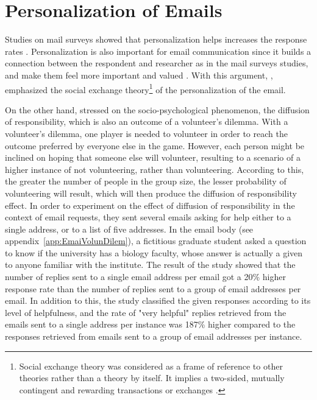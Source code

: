 \section{Personalization of Emails}
\label{sec:2.3:PersEmai}
Studies on mail surveys showed that personalization helps increases the response rates \citep{Dillman1991,Schaefer1998}. Personalization is also important for email communication since it builds a connection between the respondent and researcher as in the mail surveys studies, and make them feel more important and valued \citep[page 272]{DillmanDonA.SmythJoleneD.Christian2009}. With this argument, \cite{DillmanDonA.SmythJoleneD.Christian2009}, emphasized the social exchange theory\footnote{Social exchange theory was considered as a frame of reference to other theories rather than a theory by itself. It implies a two-sided, mutually contingent and rewarding transactions or exchanges \citep{Emerson1976}.} of the personalization of the email.
\vspace{1cm}

On the other hand, \cite{Barron2002} stressed on the socio-psychological phenomenon, the diffusion of responsibility, which is also an outcome of a volunteer's dilemma. With a volunteer's dilemma, one player is needed to volunteer in order to reach the outcome preferred by everyone else in the game. However, each person might be inclined on hoping that someone else will volunteer, resulting to a scenario of a higher instance of not volunteering, rather than volunteering. According to this, the greater the number of people in the group size, the lesser probability of volunteering will result, which will then produce the diffusion of responsibility effect. In order to experiment on the effect of diffusion of responsibility in the context of email requests, they sent several emails asking for help either to a single address, or to a list of five addresses. In the email body (see appendix~\ref{app:EmaiVolunDilem}), a fictitious graduate student asked a question to know if the university has a biology faculty, whose answer is actually a given to anyone familiar with the institute. The result of the study showed that the number of replies sent to a single email address per email got a 20\% higher response rate than the number of replies sent to a group of email addresses per email. In addition to this, the study classified the given responses according to its level of helpfulness, and the rate of "very helpful" replies retrieved from the emails sent to a single address per instance was 187\% higher compared to the responses retrieved from emails sent to a group of email addresses per instance.
\vspace{1cm}

